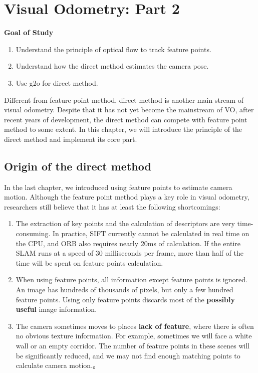\chapter{Visual Odometry: Part 2}
\label{cpt:vo2}
\label{cpt:8}
\begin{mdframed}  
	\textbf{Goal of Study}
	\begin{enumerate}[labelindent=0em,leftmargin=1.5em]
		\item Understand the principle of optical flow to track feature points.
		\item Understand how the direct method estimates the camera pose.
		\item Use g2o for direct method.
	\end{enumerate}
\end{mdframed}

Different from feature point method, direct method is another main stream of visual odometry. Despite that it has not yet become the mainstream of VO, after recent years of development, the direct method can compete with feature point method to some extent. In this chapter, we will introduce the principle of the direct method and implement its core part.

\newpage


\newpage
\section{Origin of the direct method}
In the last chapter, we introduced using feature points to estimate camera motion. Although the feature point method plays a key role in visual odometry, researchers still believe that it has at least the following shortcomings:

\begin{enumerate}
	\item The extraction of key points and the calculation of descriptors are very time-consuming. In practice, SIFT currently cannot be calculated in real time on the CPU, and ORB also requires nearly 20ms of calculation. If the entire SLAM runs at a speed of 30 milliseconds per frame, more than half of the time will be spent on feature points calculation.

	\item When using feature points, all information except feature points is ignored. An image has hundreds of thousands of pixels, but only a few hundred feature points. Using only feature points discards most of the \textbf{possibly useful} image information. 
	
	\item The camera sometimes moves to places \textbf{lack of feature}, where there is often no obvious texture information. For example, sometimes we will face a white wall or an empty corridor. The number of feature points in these scenes will be significantly reduced, and we may not find enough matching points to calculate camera motion.。
\end{enumerate}

